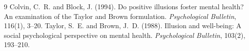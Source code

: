 \documentclass{situationist-preprint}
\begin{document}
\begin{thebibliography}{9}\small
{} Colvin, C.~R. and Block, J. (1994). Do positive illusions foster mental health? An examination of the Taylor and Brown formulation. \emph{Psychological Bulletin}, 116(1), 3--20.
 Taylor, S.~E. and Brown, J.~D. (1988). Illusion and well-being: A social psychological perspective on mental health. \emph{Psychological Bulletin}, 103(2), 193--210.
\end{thebibliography}
\end{document}
